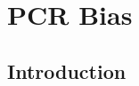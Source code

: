 \documentclass[parskip=full, numbers=noenddot]{scrreprt}
\begin{document}


\chapter{PCR Bias}
\label{ch:pcrbias}

\section{Introduction}
\label{sec:pcrbias_intro}
\end{document}
